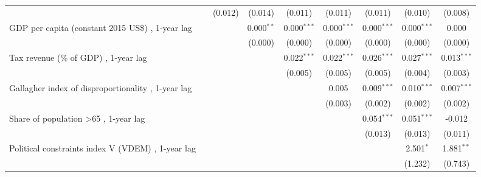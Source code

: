 \begin{table}[htbp]
\begin{tabular}{lcccccccc}
                                                                                  &              & (0.012)        & (0.014)        & (0.011)        & (0.011)        & (0.011)        & (0.010)        & (0.008)\\   
      GDP per capita (constant 2015 US\$) , 1-year lag                            &              &                & 0.000$^{**}$   & 0.000$^{***}$  & 0.000$^{***}$  & 0.000$^{***}$  & 0.000$^{***}$  & 0.000\\   
                                                                                  &              &                & (0.000)        & (0.000)        & (0.000)        & (0.000)        & (0.000)        & (0.000)\\   
      Tax revenue (\% of GDP) , 1-year lag                                        &              &                &                & 0.022$^{***}$  & 0.022$^{***}$  & 0.026$^{***}$  & 0.027$^{***}$  & 0.013$^{***}$\\   
                                                                                  &              &                &                & (0.005)        & (0.005)        & (0.005)        & (0.004)        & (0.003)\\   
      Gallagher index of disproportionality , 1-year lag                          &              &                &                &                & 0.005          & 0.009$^{***}$  & 0.010$^{***}$  & 0.007$^{***}$\\   
                                                                                  &              &                &                &                & (0.003)        & (0.002)        & (0.002)        & (0.002)\\   
      Share of population >65 , 1-year lag                                        &              &                &                &                &                & 0.054$^{***}$  & 0.051$^{***}$  & -0.012\\   
                                                                                  &              &                &                &                &                & (0.013)        & (0.013)        & (0.011)\\   
      Political constraints index V (VDEM) , 1-year lag                           &              &                &                &                &                &                & 2.501$^{*}$    & 1.881$^{**}$\\   
                                                                                  &              &                &                &                &                &                & (1.232)        & (0.743)\\   

\end{tabular}
\end{table}
